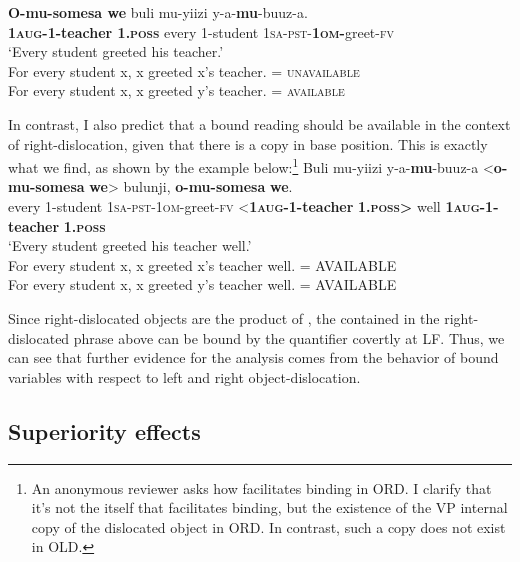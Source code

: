 \documentclass[output=paper
,newtxmath
,modfonts
,nonflat]{langsci/langscibook}
\begin{document}
\ea\label{ex:ranero:36}
\gll \textbf{O-mu-somesa  we}         buli    mu-yiizi   y-a-\textbf{mu}{}-buuz-a.\\
\textbf{1\textsc{aug}}\textbf{{}-1-teacher 1.}\textbf{\textsc{poss}} every 1-student \textsc{1sa-pst-}\textbf{\textsc{1om}}\textbf{{}-}greet-\textsc{fv}\\
\glt ‘Every student greeted his teacher.’\\ 
\-\hspace{1cm}For every student x, x greeted x’s teacher. = \textsc{unavailable}\\
\-\hspace{1cm}For every student x, x greeted y’s teacher. = \textsc{available}
\z

In contrast, I also predict that a bound reading should be available in the context of right-dislocation, given that there is a copy in base position. This is exactly what we find, as shown by the example below:\footnote{An anonymous reviewer asks how  facilitates binding in ORD. I clarify that it’s not the  itself that facilitates binding, but the existence of the VP internal copy of the dislocated object in ORD. In contrast, such a copy does not exist in OLD.}
\ea\label{ex:ranero:37}
\gll Buli   mu-yiizi  y-a-\textbf{mu}{}-buuz-a <\textbf{o-mu-somesa}    \textbf{we}> bulunji, \textbf{o-mu-somesa}     \textbf{we}.\\
every 1-student \textsc{1sa-pst-1om}{}-greet-\textsc{fv} <\textbf{1\textsc{aug}}\textbf{{}-1-teacher} \textbf{1.\textsc{poss>}} well \textbf{1\textsc{aug}}\textbf{{}-1-teacher} \textbf{1.\textsc{poss}}\\        
\glt ‘Every student greeted his teacher well.’ \\

\-\hspace{1cm}For every student x, x greeted x’s teacher well. = AVAILABLE\\
\-\hspace{1cm}For every student x, x greeted y’s teacher well. = AVAILABLE
\z

Since right-dislocated objects are the product of , the  contained in the right-dislocated phrase above can be bound by the quantifier  covertly at LF. Thus, we can see that further evidence for the analysis comes from the behavior of bound variables with respect to left and right object-dislocation.

\subsection{Superiority effects}\label{sec:ranero:5.3}
\end{document}
